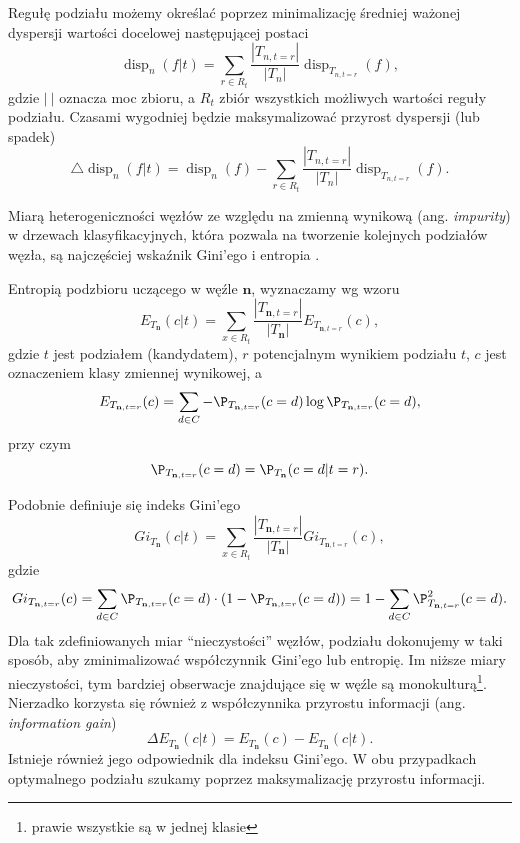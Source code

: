 \documentclass[]{book}
\let\rmarkdownfootnote\footnote%
\def\footnote{\protect\rmarkdownfootnote}
\theoremstyle{plain}
\theoremstyle{definition}
\begin{document}
Regułę podziału możemy określać poprzez minimalizację średniej ważonej dyspersji wartości docelowej następującej postaci
\begin{equation}\label{reg_podz}
        \operatorname{disp}_n(f|t)=\sum_{r\in R_t}\frac{|T_{n,t=r}|}{|T_n|}\operatorname{disp}_{T_{n,t=r}}(f),
\end{equation}
gdzie \(|\  |\) oznacza moc zbioru, a \(R_t\) zbiór wszystkich możliwych wartości reguły podziału. Czasami wygodniej będzie maksymalizować przyrost dyspersji (lub spadek)
\begin{equation}\label{przyrost}
        \bigtriangleup \operatorname{disp}_n(f|t)=\operatorname{disp}_n(f)-\sum_{r\in R_t}\frac{|T_{n,t=r}|}{|T_n|}\operatorname{disp}_{T_{n,t=r}}(f).
\end{equation}

Miarą heterogeniczności węzłów ze względu na zmienną wynikową (ang. \emph{impurity}) w drzewach klasyfikacyjnych, która pozwala na tworzenie kolejnych podziałów węzła, są najczęściej wskaźnik Gini'ego i entropia \citep{Breiman1984}.

Entropią podzbioru uczącego w węźle \(\mathbf{n}\), wyznaczamy wg wzoru
\begin{equation}
E_{T_{\mathbf{n}}}(c|t) = \sum_{x\in R_t} \frac{|T_{\mathbf{n}, t=r}|}{|T_{\mathbf{n}}|}E_{T_{\mathbf{n}, t=r}}(c),
\end{equation}
gdzie \(t\) jest podziałem (kandydatem), \(r\) potencjalnym wynikiem podziału \(t\), \(c\) jest oznaczeniem klasy zmiennej wynikowej, a
\begin{equation}
    E_{T_{\mathbf{n}, t=r}}(c) = \sum_{d\in C}-\P_{T_{\mathbf{n}, t=r}}(c=d)\log\P_{T_{\mathbf{n}, t=r}}(c=d),
\end{equation}
przy czym
\begin{equation}
    \P_{T_{\mathbf{n}, t=r}}(c=d)= \P_{T_{\mathbf{n}}}(c=d|t=r).
\end{equation}

Podobnie definiuje się indeks Gini'ego
\begin{equation}
Gi_{T_{\mathbf{n}}}(c|t) = \sum_{x\in R_t} \frac{|T_{\mathbf{n}, t=r}|}{|T_{\mathbf{n}}|}Gi_{T_{\mathbf{n}, t=r}}(c),
\end{equation}
gdzie
\begin{equation}
    Gi_{T_{\mathbf{n}, t=r}}(c) = \sum_{d\in C}\P_{T_{\mathbf{n}, t=r}}(c=d)\cdot(1-\P_{T_{\mathbf{n}, t=r}}(c=d))= 1-\sum_{d\in C}\P^2_{T_{\mathbf{n}, t=r}}(c=d).
\end{equation}
Dla tak zdefiniowanych miar ``nieczystości'' węzłów, podziału dokonujemy w taki sposób, aby zminimalizować współczynnik Gini'ego lub entropię. Im niższe miary nieczystości, tym bardziej obserwacje znajdujące się w węźle są monokulturą\footnote{prawie wszystkie są w jednej klasie}. Nierzadko korzysta się również z współczynnika przyrostu informacji (ang. \emph{information gain})
\begin{equation}
    \Delta E_{T_{\mathbf{n}}}(c|t)=E_{T_{\mathbf{n}}}(c)-E_{T_{\mathbf{n}}}(c|t).
\end{equation}
Istnieje również jego odpowiednik dla indeksu Gini'ego. W obu przypadkach optymalnego podziału szukamy poprzez maksymalizację przyrostu informacji.
\end{document}
